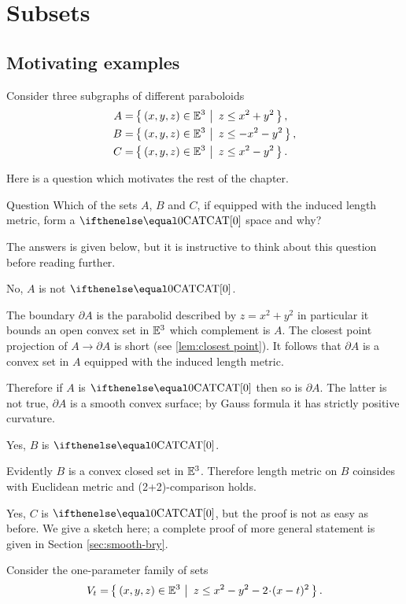 \chapter{Subsets}

\section{Motivating examples}

Consider three subgraphs of different paraboloids
\begin{align*}
A&=\set{(x,y,z)\in\EE^3}{z\le x^2+y^2},
\\
B&=\set{(x,y,z)\in\EE^3}{z\le -x^2-y^2},
\\
C&=\set{(x,y,z)\in\EE^3}{z\le x^2-y^2}.
\end{align*}

Here is a question which motivates the rest of the chapter.


\begin{thm}{Question}
Which of the sets $A$, $B$ and $C$, if equipped with the induced length metric, form a $\CAT{0}$ space and why?
\end{thm}

The answers is given below, but it is instructive to think about this question before reading further.

 No, $A$ is not $\CAT0$.
 
The boundary $\partial A$ is the parabolid described by  $z=x^2+y^2$ in particular it bounds an open convex set in $\mathbb{E}^3$ which complement is $A$.
The closest point projection of $A\to\partial A$ is short (see \ref{lem:closest point}).
It follows that $\partial A$ is a convex set in $A$ equipped with the induced length metric.

Therefore if $A$ is $\CAT0$ then so is $\partial A$.
The latter is not true, $\partial A$ is a smooth convex surface; by Gauss formula it has strictly positive curvature.


 Yes, $B$ is $\CAT0$. 

Evidently $B$ is a convex closed set in $\mathbb{E}^3$. 
Therefore length metric on $B$ coinsides with Euclidean metric
and (2+2)-comparison holds.

 Yes, $C$ is $\CAT0$, 
but the proof is not as easy as before.
We give a sketch here;
a complete proof of more general statement is given in Section \ref{sec:smooth-bry}.

Consider the one-parameter family of sets 
\[V_t=\set{(x,y,z)\in\EE^3}{z\le x^2-y^2 -2\cdot (x-t)^2}.\]

